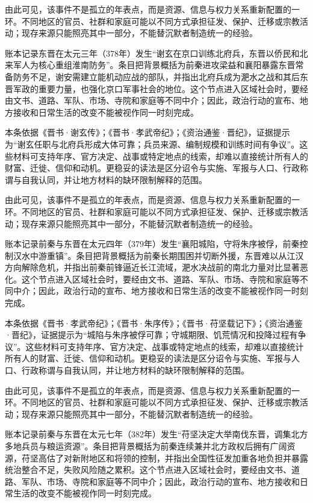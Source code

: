 由此可见，该事件不是孤立的年表点，而是资源、信息与权力关系重新配置的一环。不同地区的官员、社群和家庭可能以不同方式承担征发、保护、迁移或宗教活动；现存来源只能照亮其中一部分，不能替沉默者制造统一的经验。

账本记录东晋在太元三年（378年）发生“谢玄在京口训练北府兵，东晋以侨民和北来军人为核心重组淮南防务”。条目把背景概括为前秦进攻梁益和襄阳暴露东晋常备防务不足，谢安需建立能机动应战的部队，并指出北府兵成为淝水之战和其后东晋军政的重要力量，也强化京口军事社会的地位。这个节点进入区域社会时，要经由文书、道路、军队、市场、寺院和家庭等不同中介；因此，政治行动的宣布、地方接收和日常生活的改变不能被视作同一时刻完成。

本条依据《晋书·谢玄传》；《晋书·孝武帝纪》；《资治通鉴·晋纪》，证据提示为“谢玄任职与北府兵形成大体可靠；兵员来源、编制规模和训练时间有争议”。这些材料可支持年序、官方决定、战事或特定地点的线索，却难以直接统计所有人的财富、迁徙、信仰和动机。更稳妥的读法是区分诏令与实施、军报与人口、行政称谓与自我认同，并让地方材料的缺环限制解释的范围。

由此可见，该事件不是孤立的年表点，而是资源、信息与权力关系重新配置的一环。不同地区的官员、社群和家庭可能以不同方式承担征发、保护、迁移或宗教活动；现存来源只能照亮其中一部分，不能替沉默者制造统一的经验。

账本记录前秦与东晋在太元四年（379年）发生“襄阳城陷，守将朱序被俘，前秦控制汉水中游重镇”。条目把背景概括为前秦长期围困并切断外援，东晋难以从江汉方向解除危机，并指出前秦前锋逼近长江流域，淝水决战前的南北力量对比显著恶化。这个节点进入区域社会时，要经由文书、道路、军队、市场、寺院和家庭等不同中介；因此，政治行动的宣布、地方接收和日常生活的改变不能被视作同一时刻完成。

本条依据《晋书·孝武帝纪》；《晋书·朱序传》；《晋书·苻坚载记下》；《资治通鉴·晋纪》，证据提示为“城陷与朱序被俘可靠；守城期限、饥荒情况和投降过程有争议”。这些材料可支持年序、官方决定、战事或特定地点的线索，却难以直接统计所有人的财富、迁徙、信仰和动机。更稳妥的读法是区分诏令与实施、军报与人口、行政称谓与自我认同，并让地方材料的缺环限制解释的范围。

由此可见，该事件不是孤立的年表点，而是资源、信息与权力关系重新配置的一环。不同地区的官员、社群和家庭可能以不同方式承担征发、保护、迁移或宗教活动；现存来源只能照亮其中一部分，不能替沉默者制造统一的经验。

账本记录前秦与东晋在太元七年（382年）发生“苻坚决定大举南伐东晋，调集北方多地兵员与粮运资源”。条目把背景概括为前秦连续兼并北方政权后拥有广阔资源，苻坚高估了对新附地区和将领的控制，并指出全国性征发加重各地负担并暴露统治整合不足，失败风险随之累积。这个节点进入区域社会时，要经由文书、道路、军队、市场、寺院和家庭等不同中介；因此，政治行动的宣布、地方接收和日常生活的改变不能被视作同一时刻完成。

